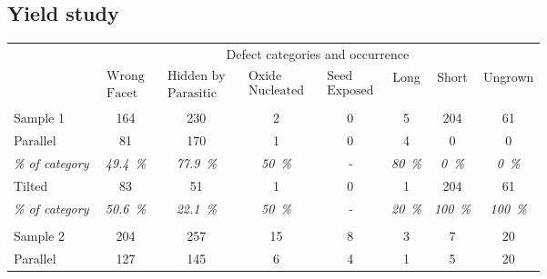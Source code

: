 \subsection{Yield study}

\begin{table}
    \centering
    \begin{tabular}{l|ccccccc}
        \hline
         & \multicolumn{7}{c}{Defect categories and occurrence} \\ 
         & $\begin{matrix} \text{Wrong} \\ \text{Facet} \end{matrix}$ & $\begin{matrix} \text{Hidden by} \\ \text{Parasitic} \end{matrix}$ & $\begin{matrix} \text{Oxide} \\ \text{Nucleated} \end{matrix}$ & $\begin{matrix} \text{Seed} \\ \text{Exposed} \end{matrix}$ & Long & Short & Ungrown \\ 
        \hline \hline
         & & & & & & & \\
        Sample 1 & \num{164} & \num{230} & \num{2} & \num{0} & \num{5} & \num{204} & \num{61} \\ 
        \hline
        Parallel & \num{81} & \num{170} & \num{1} & \num{0} & \num{4} & \num{0} & \num{0} \\
        \textit{\% of category} & \textit{\qty{49.4}{\%}} & \textit{\qty{77.9}{\%}} & \textit{\qty{50}{\%}} & \textit{-} & \textit{\qty{80}{\%}} & \textit{\qty{0}{\%}} & \textit{\qty{0}{\%}} \\ 
        \hline
        Tilted & \num{83} & \num{51} & \num{1} & \num{0} & \num{1} & \num{204} & \num{61} \\
        \textit{\% of category} & \textit{\qty{50.6}{\%}} & \textit{\qty{22.1}{\%}} & \textit{\qty{50}{\%}} & \textit{-} & \textit{\qty{20}{\%}} & \textit{\qty{100}{\%}} & \textit{\qty{100}{\%}} \\ 
        \hline
         & & & & & & & \\
        Sample 2 & \num{204} & \num{257} & \num{15} & \num{8} & \num{3} & \num{7} & \num{20} \\ 
        \hline
        Parallel & \num{127} & \num{145} & \num{6} & \num{4} & \num{1} & \num{5} & \num{20} \\

\end{tabular}
\end{table}
